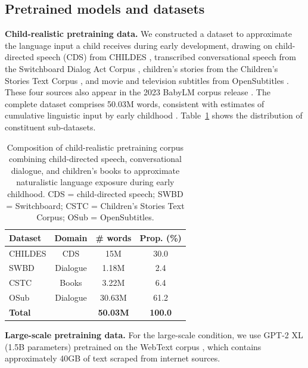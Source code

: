 \subsection{Pretrained models and datasets}
\label{app:model_dataset}


\noindent \textbf{Child-realistic pretraining data.} We constructed a dataset to approximate the language input a child receives during early development, drawing on child-directed speech (CDS) from CHILDES \citep{macwhinney2000childes}, transcribed conversational speech from the Switchboard Dialog Act Corpus \citep{godfrey1992switchboard,stolcke2000dialogue}, children's stories from the Children's Stories Text Corpus \citep{bensaid2021cstc,bensaid2021fairytailor}, and movie and television subtitles from OpenSubtitles \citep{lison2016opensubtitles}. These four sources also appear in the 2023 BabyLM corpus release
\citep{warstadt2023findings}. The complete dataset comprises 50.03M words, consistent with estimates of cumulative linguistic input by early childhood \citep{gilkerson2017mapping,frank2023bridging}. Table~\ref{tab:training_data} shows the distribution of constituent sub-datasets.


\begin{table}[ht]
\centering
\small
\vspace{8pt}
\caption{Composition of child-realistic pretraining corpus combining child-directed
speech, conversational dialogue, and children's books to approximate naturalistic
language exposure during early childhood. CDS = child-directed speech; SWBD = Switchboard; CSTC = Children's Stories Text Corpus; OSub = OpenSubtitles.}
\label{tab:training_data}
\setlength{\tabcolsep}{4pt}
\renewcommand{\arraystretch}{1.1}
\begin{tabular}{lccc}
\toprule
\textbf{Dataset} & \textbf{Domain} & \textbf{\# words} & \textbf{Prop. (\%)} \\
\midrule
CHILDES & CDS      & 15M    & 30.0 \\
SWBD    & Dialogue & 1.18M  & 2.4  \\
CSTC    & Books    & 3.22M  & 6.4  \\
OSub    & Dialogue & 30.63M & 61.2 \\
\midrule
\textbf{Total} & & \textbf{50.03M} & \textbf{100.0} \\
\bottomrule
\end{tabular}
\end{table}



\noindent \textbf{Large-scale pretraining data.} For the large-scale condition, we use GPT-2 XL (1.5B parameters) pretrained on the WebText corpus \citep{radford2019language}, which contains approximately 40GB of text scraped from internet sources.

